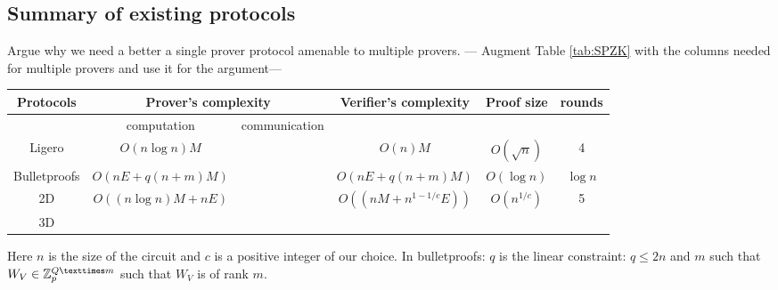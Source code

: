 \subsection{Summary of existing protocols}
Argue why we need a better a single prover protocol amenable to multiple provers. 
--- Augment Table \ref{tab:SPZK} with the columns needed for multiple provers and use it for the argument--- 
\begin{center}
	\begin{tabular}{ |c|c|c|c|c|c| } 
		\hline
		Protocols & \multicolumn{2}{c|}{Prover's complexity} & Verifier's complexity & Proof size & rounds \\
		\hline
		&computation & communication& & & \\ 
		\hline
		Ligero & $O(n\log n)M$ & &$O(n)M$ & $O(\sqrt{n})$ & 4\\
		\hline
		Bulletproofs & $O(nE+q(n+m)M)$ & & $O(nE+q(n+m)M)$ & $O(\log n)$ & $\log n$  \\
		\hline
		\name2D & $O((n \log ⁡n)M +nE)$& & $O((n M+n^{1-1/c}E) )$& $O(n^{1/c})$ & 5 \\
		\hline
		\name3D & & & & & \\
		\hline
	\end{tabular}
\end{center}
Here $n$ is the size of the circuit and $c$ is a positive integer of our choice. 
In bulletproofs: $q$ is the linear constraint: $q\leq 2n$ and $m$ such that $W_V \in \bbZ_p^{Q×m}$  such that $W_V$ is of rank $m$.


